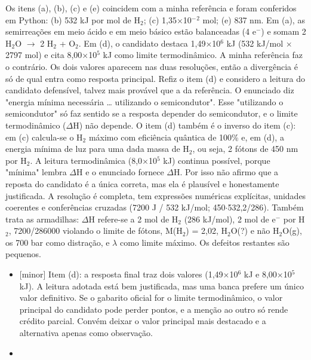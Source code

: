 \documentclass{article}%
\begin{document}
Os itens (a), (b), (c) e (e) coincidem com a minha referência e foram conferidos em Python: (b) 532 kJ por mol de H$_{2}$; (c) 1,35$\times$10$^{-}$$^2$ mol; (e) 837 nm. Em (a), as semirreações em meio ácido e em meio básico estão balanceadas (4 e$^{-}$) e somam 2 H$_{2}$O $\to$ 2 H$_{2}$ + O$_{2}$. Em (d), o candidato destaca 1,49$\times$10$^{6}$ kJ (532 kJ/mol $\times$ 2797 mol) e cita 8,00$\times$10$^{5}$ kJ como limite termodinâmico. A minha referência faz o contrário. Os dois valores aparecem nas duas resoluções, então a divergência é só de qual entra como resposta principal.\newline%
\newline%
Refiz o item (d) e considero a leitura do candidato defensível, talvez mais provável que a da referência. O enunciado diz "energia mínima necessária \ldots{} utilizando o semicondutor". Esse "utilizando o semicondutor" só faz sentido se a resposta depender do semicondutor, e o limite termodinâmico ($\Delta$H) não depende. O item (d) também é o inverso do item (c): em (c) calcula{-}se o H$_{2}$ máximo com eficiência quântica de 100\% e, em (d), a energia mínima de luz para uma dada massa de H$_{2}$, ou seja, 2 fótons de 450 nm por H$_{2}$. A leitura termodinâmica (8,0$\times$10$^{5}$ kJ) continua possível, porque "mínima" lembra $\Delta$H e o enunciado fornece $\Delta$H. Por isso não afirmo que a reposta do candidato é a única correta, mas ela é plausível e honestamente justificada.\newline%
\newline%
A resolução é completa, tem expressões numéricas explícitas, unidades coerentes e conferências cruzadas (7200 J / 532 kJ/mol; 450$\cdot$532,2/286). Também trata as armadilhas: $\Delta$H refere{-}se a 2 mol de H$_{2}$ (286 kJ/mol), 2 mol de e$^{-}$ por H$_{2}$, 7200/286000 violando o limite de fótons, M(H$_{2}$) = 2,02, H$_{2}$O(?) e não H$_{2}$O(g), os 700 bar como distração, e $\lambda$ como limite máximo. Os defeitos restantes são pequenos.%
\begin{itemize}%
\item%
{[}minor{]} Item (d): a resposta final traz dois valores (1,49$\times$10$^{6}$ kJ e 8,00$\times$10$^{5}$ kJ). A leitura adotada está bem justificada, mas uma banca prefere um único valor definitivo. Se o gabarito oficial for o limite termodinâmico, o valor principal do candidato pode perder pontos, e a menção ao outro só rende crédito parcial. Convém deixar o valor principal mais destacado e a alternativa apenas como observação.%
\item%

\end{itemize}$$
\end{document}
